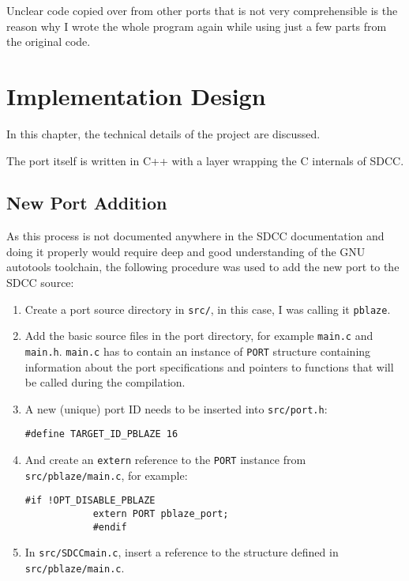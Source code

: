         Unclear code copied over from other ports that is not very comprehensible is the reason why I wrote the whole program again while using just a few parts from the original code.

\chapter{Implementation Design}\label{design}

In this chapter, the technical details of the project are discussed.

The port itself is written in C++ with a layer wrapping the C internals of SDCC.

    \section{New Port Addition}\label{compilation}

        As this process is not documented anywhere in the SDCC documentation and doing it properly would require deep and good understanding of the GNU autotools toolchain, the following procedure was used to add the new port to the SDCC source:

        \begin{enumerate}

        \item Create a port source directory in \texttt{src/}, in this case, I was calling it \texttt{pblaze}.

        \item Add the basic source files in the port directory, for example \texttt{main.c} and \texttt{main.h}. \texttt{main.c} has to contain an instance of \texttt{PORT} structure containing information about the port specifications and pointers to functions that will be called during the compilation.

        \item A new (unique) port ID needs to be inserted into \texttt{src/port.h}:

        \texttt{\#define TARGET\_ID\_PBLAZE    16}

        \item And create an \texttt{extern} reference to the \texttt{PORT} instance from \texttt{src/pblaze/main.c}, for example:

            \begin{verbatim}#if !OPT_DISABLE_PBLAZE
            extern PORT pblaze_port;
            #endif\end{verbatim}

        \item In \texttt{src/SDCCmain.c}, insert a reference to the structure defined in \texttt{src/pblaze/main.c}.

        \end{enumerate}

